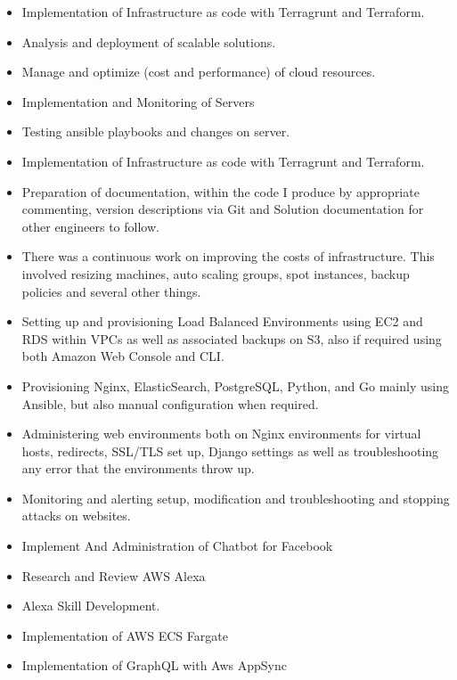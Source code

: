\begin{itemize}
    \item Implementation of Infrastructure as code with Terragrunt and Terraform.
    \item Analysis and deployment of scalable solutions.
    \item Manage and optimize (cost and performance) of cloud resources.
    \item Implementation and Monitoring of Servers
    \item Testing ansible playbooks and changes on server.
\end{itemize}

\divider

\begin{itemize}
    \item Implementation of Infrastructure as code with Terragrunt and Terraform.
    \item Preparation of documentation, within the code I produce by appropriate commenting, version descriptions via Git and Solution documentation for other engineers to follow.
    \item There was a continuous work on improving the costs of infrastructure. This involved resizing machines, auto scaling groups, spot instances, backup policies and several other things.
    \item Setting up and provisioning Load Balanced Environments using EC2 and RDS within VPCs as well as associated backups on S3, also if required using both Amazon Web Console and CLI.
    \item Provisioning Nginx, ElasticSearch, PostgreSQL, Python, and Go mainly using Ansible, but also manual configuration when required.
    \item Administering web environments both on Nginx environments for virtual hosts, redirects, SSL/TLS set up, Django settings as well as troubleshooting any error that the environments throw up.
    \item Monitoring and alerting setup, modification and troubleshooting and stopping attacks on websites.
    \item Implement And Administration of Chatbot for Facebook
    \item Research and Review AWS Alexa
    \item Alexa Skill Development.
    \item Implementation of AWS ECS Fargate
    \item Implementation of GraphQL with Aws AppSync
\end{itemize}

